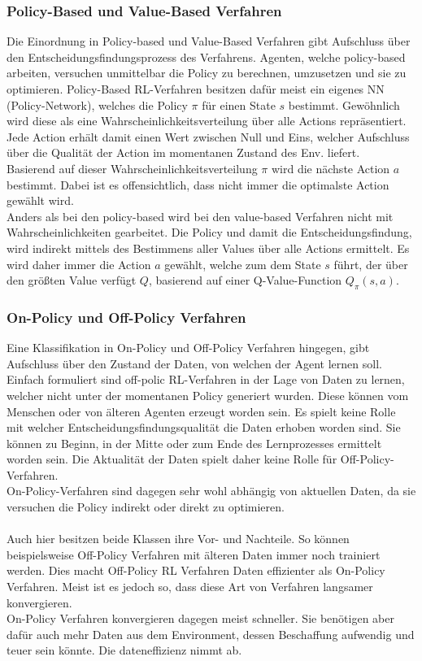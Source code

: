 \subsubsection{Policy-Based und Value-Based Verfahren} \label{sec:RL_policy_value}
Die Einordnung in Policy-based und Value-Based Verfahren gibt Aufschluss über den Entscheidungsfindungsprozess des Verfahrens.
Agenten, welche policy-based arbeiten, versuchen unmittelbar die Policy zu berechnen, umzusetzen und sie zu optimieren. Policy-Based RL-Verfahren besitzen dafür meist ein eigenes NN (Policy-Network), welches die Policy $\pi$ für einen State $s$ bestimmt.
Gewöhnlich wird diese als eine Wahrscheinlichkeitsverteilung über alle Actions repräsentiert. Jede Action erhält damit einen Wert zwischen Null und Eins, welcher Aufschluss über die Qualität der Action im momentanen Zustand des Env. liefert. \cite[S. 100]{DRL_Lapan} \\
Basierend auf dieser Wahrscheinlichkeitsverteilung $\pi$ wird die nächste Action $a$ bestimmt. Dabei ist es offensichtlich, dass nicht immer die optimalste Action gewählt wird.\\
Anders als bei den policy-based wird bei den value-based Verfahren nicht mit Wahrscheinlichkeiten gearbeitet. Die Policy und damit die Entscheidungsfindung, wird indirekt mittels des Bestimmens aller Values über alle Actions ermittelt. Es wird daher immer die Action $a$ gewählt, welche zum dem State $s$ führt, der über den größten Value verfügt $Q$, basierend auf einer Q-Value-Function $Q_\pi(s,a)$. \cite[S. 100]{DRL_Lapan}

\subsubsection{On-Policy und Off-Policy Verfahren}
Eine Klassifikation in On-Policy und Off-Policy Verfahren hingegen, gibt Aufschluss über den Zustand der Daten, von welchen der Agent lernen soll. 
Einfach formuliert sind off-polic RL-Verfahren in der Lage von Daten zu lernen, welcher nicht unter der momentanen Policy generiert wurden. Diese können vom Menschen oder von älteren Agenten erzeugt worden sein. Es spielt keine Rolle mit welcher Entscheidungsfindungsqualität die Daten erhoben worden sind. Sie können zu Beginn, in der Mitte oder zum Ende des Lernprozesses ermittelt worden sein. Die Aktualität der Daten spielt daher keine Rolle für Off-Policy-Verfahren. \cite[S. 210 f.]{DRL_Lapan}\\
On-Policy-Verfahren sind dagegen sehr wohl abhängig von aktuellen Daten, da sie versuchen die Policy indirekt oder direkt zu optimieren.\\
\\Auch hier besitzen beide Klassen ihre Vor- und Nachteile. So können beispielsweise Off-Policy Verfahren mit älteren Daten immer noch trainiert werden. Dies macht Off-Policy RL Verfahren Daten effizienter als On-Policy Verfahren. Meist ist es jedoch so, dass diese Art von Verfahren langsamer konvergieren.\\
On-Policy Verfahren konvergieren dagegen meist schneller. Sie benötigen aber dafür auch mehr Daten aus dem Environment, dessen Beschaffung aufwendig und teuer sein könnte. Die dateneffizienz nimmt ab.\cite[S. 210 f.]{DRL_Lapan}

